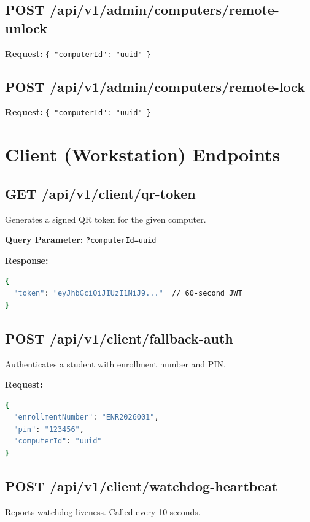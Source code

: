 \subsection{POST /api/v1/admin/computers/remote-unlock}
\textbf{Request:} \verb|{ "computerId": "uuid" }|

\subsection{POST /api/v1/admin/computers/remote-lock}
\textbf{Request:} \verb|{ "computerId": "uuid" }|

\section{Client (Workstation) Endpoints}

\subsection{GET /api/v1/client/qr-token}
Generates a signed QR token for the given computer.

\textbf{Query Parameter:} \verb|?computerId=uuid|

\textbf{Response:}
\begin{tcolorbox}[codebox, title={Response}]
\begin{lstlisting}[language=bash]
{
  "token": "eyJhbGciOiJIUzI1NiJ9..."  // 60-second JWT
}
\end{lstlisting}
\end{tcolorbox}

\subsection{POST /api/v1/client/fallback-auth}
Authenticates a student with enrollment number and PIN.

\textbf{Request:}
\begin{tcolorbox}[codebox, title={Request}]
\begin{lstlisting}[language=bash]
{
  "enrollmentNumber": "ENR2026001",
  "pin": "123456",
  "computerId": "uuid"
}
\end{lstlisting}
\end{tcolorbox}

\subsection{POST /api/v1/client/watchdog-heartbeat}
Reports watchdog liveness. Called every 10 seconds.

